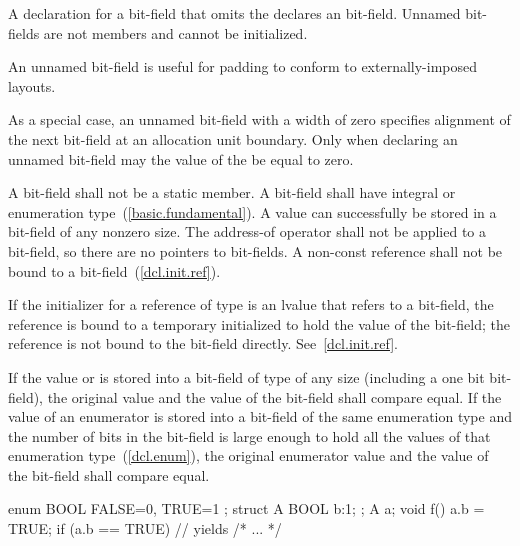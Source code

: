 \pnum
{}%
A declaration for a bit-field that omits the 
declares an  bit-field. Unnamed bit-fields are not
members and cannot be initialized.
\begin{note}
An unnamed bit-field is useful for padding to conform to
externally-imposed layouts.
\end{note}
%
%
As a special case, an unnamed bit-field with a width of zero specifies
alignment of the next bit-field at an allocation unit boundary. Only
when declaring an unnamed bit-field may the value of the
 be equal to zero.

\pnum
{}%
A bit-field shall not be a static member. A bit-field shall have
integral or enumeration type~(\ref{basic.fundamental}).
%
A  value can successfully be stored in a bit-field of any
nonzero size.
%
The address-of operator \tcode{\&} shall not be applied to a bit-field,
so there are no pointers to bit-fields.
%
%
%
A non-const reference shall not be bound to a
bit-field~(\ref{dcl.init.ref}).
\begin{note}
If the initializer for a reference of type   is
an lvalue that refers to a bit-field, the reference is bound to a
temporary initialized to hold the value of the bit-field; the reference
is not bound to the bit-field directly. See~\ref{dcl.init.ref}.
\end{note}

\pnum
If the value  or  is stored into a bit-field of
type  of any size (including a one bit bit-field), the
original  value and the value of the bit-field shall compare
equal. If the value of an enumerator is stored into a bit-field of the
same enumeration type and the number of bits in the bit-field is large
enough to hold all the values of that enumeration type~(\ref{dcl.enum}),
the original enumerator value and the value of the bit-field shall
compare equal.
\begin{example}

\begin{codeblock}
enum BOOL { FALSE=0, TRUE=1 };
struct A {
  BOOL b:1;
};
A a;
void f() {
  a.b = TRUE;
  if (a.b == TRUE)              // yields 
    { /* ... */ }
}
\end{codeblock}
\end{example}

